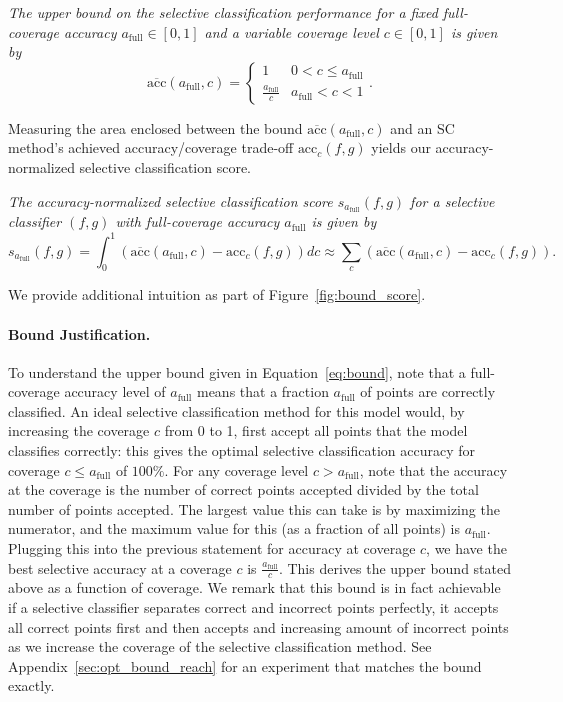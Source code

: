\begin{definition}
\emph{The upper bound on the selective classification performance for a fixed full-coverage accuracy $a_\text{full} \in [0,1]$ and a variable coverage level $c \in [0,1]$ is given by
    \begin{equation}
        \label{eq:sc_dp_bound}
        \overline{\text{acc}}(a_\text{full},c) = \begin{cases}
  1  & 0 < c \leq a_\text{full} \\
  \frac{a_\text{full}}{c} & a_\text{full} < c < 1
\end{cases}.
    \end{equation}
    }
\end{definition}
Measuring the area enclosed between the bound $\overline{\text{acc}}(a_\text{full},c)$ and an SC method's achieved accuracy/coverage trade-off $\text{acc}_c(f,g)$ yields our accuracy-normalized selective classification score. 
\begin{definition}
  \emph{The accuracy-normalized selective classification score $s_{a_\text{full}}(f,g)$ for a selective classifier $(f,g)$ with full-coverage accuracy $a_\text{full}$ is given by
  \begin{equation}
  \label{eq:acc_norm_score}
        s_{a_\text{full}}(f,g) = \int_0^1 (\overline{\text{acc}}(a_\text{full},c) - \text{acc}_c(f,g)) dc \approx \sum_c (\overline{\text{acc}}(a_\text{full},c) - \text{acc}_c(f,g)).
    \end{equation}
    }
\end{definition}
We provide additional intuition as part of Figure~\ref{fig:bound_score}.

\paragraph{Bound Justification.} To understand the upper bound given in Equation~\ref{eq:bound}, note that a full-coverage accuracy level of $a_\text{full}$ means that a fraction $a_\text{full}$ of points are correctly classified. An ideal selective classification method for this model would, by increasing the coverage $c$ from 0 to 1, first accept all points that the model classifies correctly: this gives the optimal selective classification accuracy for coverage $c \leq a_{\text{full}}$ of $100\%$. For any coverage level $c > a_{\text{full}}$, note that the accuracy at the coverage is the number of correct points accepted divided by the total number of points accepted. The largest value this can take is by maximizing the numerator, and the maximum value for this (as a fraction of all points) is $a_{\text{full}}$. Plugging this into the previous statement for accuracy at coverage $c$, we have the best selective accuracy at a coverage $c$ is $\frac{a_{\text{full}}}{c}$. This derives the upper bound stated above as a function of coverage. We remark that this bound is in fact achievable if a selective classifier separates correct and incorrect points perfectly, \ie it accepts all correct points first and then accepts and increasing amount of incorrect points as we increase the coverage of the selective classification method. See Appendix~\ref{sec:opt_bound_reach} for an experiment that matches the bound exactly. 

